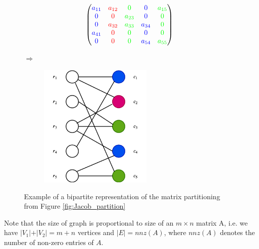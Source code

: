 	\begin{figure}[H]
		\centering
		\begin{subfigure}{0.45\linewidth}
			$$ \left(\begin{matrix}
			{\color{blue} a_{11}} & {\color{red} a_{12}} & {\color{green} 0 }        & 
			{\color{blue} 0 }       & {\color{green} a_{15}} \\
			{\color{blue} 0}        & {\color{red} 0 }       & {\color{green} a_{23}}  & 
			{\color{blue} 0 }      & {\color{green} 0} \\
			{\color{blue} 0}        & {\color{red} a_{32}} &  {\color{green} a_{33}}  &
			{\color{blue} a_{34}} & {\color{green} 0 } \\
			{\color{blue} a_{41}} & {\color{red} 0 }       & {\color{green} 0 }         &
			{\color{blue} 0 }        & {\color{green} 0} \\
			{\color{blue} 0 }       & {\color{red} 0 }       & {\color{green} 0 }         &
			{\color{blue} a_{54}} & {\color{green} a_{55} }
			\end{matrix}\right) $$
		\end{subfigure}
		$\Rightarrow$ \hfill 
		\begin{subfigure}{0.45\linewidth}
			\includegraphics[width=0.6\textwidth]{pics/bipartite.png} 
		\end{subfigure}
		\caption{Example of a bipartite representation of the matrix partitioning
			from Figure \ref{fig:Jacob_partition}}
		\label{fig:bipartite}
	\end{figure}
	Note that the size of graph is proportional to size of an $m \times n$ matrix A,
	i.e. we have $\vert V_1 \vert  + \vert V_2 \vert = m + n$ vertices and $\vert E
	\vert = nnz(A)$, where $nnz(A)$ denotes the number of non-zero entries of $A$.
